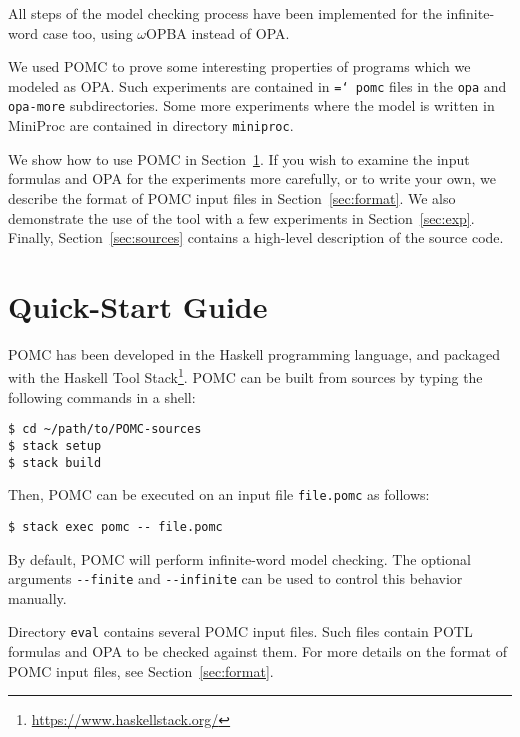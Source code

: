 \documentclass[9pt,a4paper]{article}
\begin{document}
All steps of the model checking process have been implemented
for the infinite-word case too, using $\omega$OPBA instead of OPA.

We used POMC to prove some interesting properties of programs which we
modeled as OPA. Such experiments are contained in
\texttt{\hyphenchar\font=`\-
  pomc}
files in the \texttt{opa} and \texttt{opa-more} subdirectories.
Some more experiments where the model is written in MiniProc are
contained in directory \texttt{miniproc}.

We show how to use POMC in Section~\ref{sec:quick-start}.
If you wish to examine the input formulas and OPA for the experiments more carefully,
or to write your own, we describe the format of POMC input files in Section~\ref{sec:format}.
We also demonstrate the use of the tool with a few experiments in Section~\ref{sec:exp}.
Finally, Section~\ref{sec:sources} contains a high-level description of the source code.


\section{Quick-Start Guide}
\label{sec:quick-start}

POMC has been developed in the Haskell programming language,
and packaged with the Haskell Tool Stack\footnote{\url{https://www.haskellstack.org/}}.
POMC can be built from sources by typing the following commands in a shell:
\begin{verbatim}
$ cd ~/path/to/POMC-sources
$ stack setup
$ stack build
\end{verbatim}
Then, POMC can be executed on an input file \verb|file.pomc| as follows:
\begin{verbatim}
$ stack exec pomc -- file.pomc
\end{verbatim}

By default, POMC will perform infinite-word model checking.
The optional arguments \verb|--finite| and \verb|--infinite|
can be used to control this behavior manually.

Directory \verb|eval| contains several POMC input files. Such files
contain POTL formulas and OPA to be checked against them. For more
details on the format of POMC input files, see
Section~\ref{sec:format}.
\end{document}

